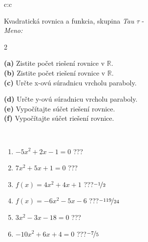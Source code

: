 \documentclass[10pt]{report}
\begin{document}
\begin{tabular}{c:c}
\begin{minipage}[c][104.5mm][t]{0.5\linewidth}
\begin{center}
\vspace{7mm}
{\huge {\LARGE Kvadratická rovnica a funkcia}, skupina \textit{Tau $\tau$} -}\\[5mm]
\textit{Meno:}\phantom{xxxxxxxxxxxxxxxxxxxxxxxxxxxxxxxxxxxxxxxxxxxxxxxxxxxxxxxxxxxxxxxxx}\\[5mm]
\begin{minipage}{0.95\linewidth}
\begin{center}
{\small \begin{multicols}{2} \raggedright
\textbf{(a)} Zistite počet riešení rovnice v \(\mathbb{R}\). \\[1mm]
\textbf{(b)} Zistite počet riešení rovnice v \(\mathbb{R}\). \\[1mm]
\textbf{(c)} Určte x-ovú súradnicu vrcholu paraboly. \par \columnbreak
\textbf{(d)} Určte y-ovú súradnicu vrcholu paraboly. \\[1mm]
\textbf{(e)} Vypočítajte súčet riešení rovnice. \\[1mm]
\textbf{(f)} Vypočítajte súčet riešení rovnice.
\end{multicols}
}
\end{center}
\end{minipage}
\\[4mm]
\begin{minipage}{0.79\linewidth}
\begin{center}
\begin{varwidth}{\linewidth}
\begin{enumerate}
\Large
\item $-5x^2+2x-1=0$\quad \dotfill\; ???\;\dotfill {}
\item $7x^2+5x+1=0$\quad \dotfill\; ???\;\dotfill {}
\item $f(x)=4x^2+4x+1$\quad \dotfill\; ???\;\dotfill \quad $\nicefrac{-1}{2}$
\item $f(x)=-6x^2-5x-6$\quad \dotfill\; ???\;\dotfill \quad $\nicefrac{-119}{24}$
\item $3x^2-3x-18=0$\quad \dotfill\; ???\;\dotfill {}
\item $-10x^2+6x+4=0$\quad \dotfill\; ???\;\dotfill \quad $\nicefrac{-7}{5}$
\end{enumerate}
\end{varwidth}
\end{center}

\end{minipage}
\end{center}
\end{minipage}
\end{tabular}
\end{document}
